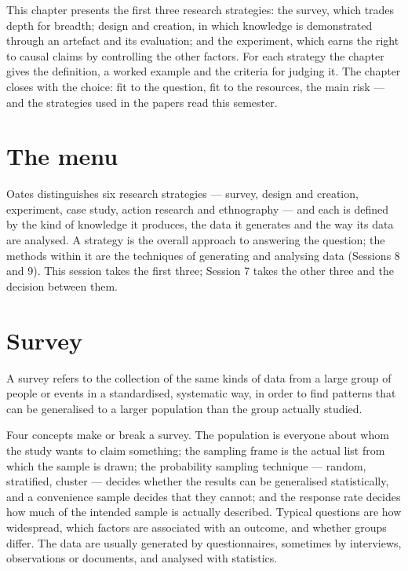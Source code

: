 \documentclass[11pt,a4paper,british,twoside=false,headings=small,chapterprefix=false,numbers=noenddot]{scrbook}
\newenvironment{block}[1]{\begin{tcolorbox}[scriptbox, title={#1}]}{\end{tcolorbox}}
\begin{document}
This chapter presents the first three research strategies: the survey, which trades depth for breadth; design and creation, in which knowledge is demonstrated through an artefact and its evaluation; and the experiment, which earns the right to causal claims by controlling the other factors. For each strategy the chapter gives the definition, a worked example and the criteria for judging it. The chapter closes with the choice: fit to the question, fit to the resources, the main risk --- and the strategies used in the papers read this semester.


\section{The menu}

Oates distinguishes six research strategies --- survey, design and creation, experiment, case study, action research and ethnography --- and each is defined by the kind of knowledge it produces, the data it generates and the way its data are analysed. A strategy is the overall approach to answering the question; the methods within it are the techniques of generating and analysing data (Sessions 8 and 9). This session takes the first three; Session 7 takes the other three and the decision between them.

\section{Survey}

\begin{block}{Survey}
A survey refers to the collection of the same kinds of data from a large group of people or events in a standardised, systematic way, in order to find patterns that can be generalised to a larger population than the group actually studied.
\end{block}

Four concepts make or break a survey. The population is everyone about whom the study wants to claim something; the sampling frame is the actual list from which the sample is drawn; the probability sampling technique --- random, stratified, cluster --- decides whether the results can be generalised statistically, and a convenience sample decides that they cannot; and the response rate decides how much of the intended sample is actually described. Typical questions are how widespread, which factors are associated with an outcome, and whether groups differ. The data are usually generated by questionnaires, sometimes by interviews, observations or documents, and analysed with statistics.
\end{document}
